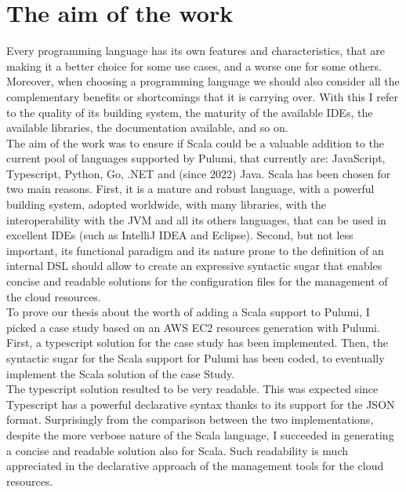\section{The aim of the work}
Every programming language has its own features and characteristics, that are making it a better choice for some use cases, and a worse one for some others.
Moreover, when choosing a programming language we should also consider all the complementary benefits or shortcomings that it is carrying over.
With this I refer to the quality of its building system, the maturity of the available IDEs, the available libraries, the documentation available, and so on.\\
The aim of the work was to ensure if Scala could be a valuable addition to the current pool of languages supported by Pulumi, that currently are: JavaScript, Typescript, Python, Go, .NET and  (since 2022) Java.
Scala has been chosen for two main reasons.
First, it is a mature and robust language, with a powerful building system, adopted worldwide, with many libraries, with the interoperability with the JVM and all its others languages, that can be used in excellent IDEs (such as IntelliJ IDEA and Eclipse).
Second, but not less important, its functional paradigm and its nature prone to the definition of an \gls{internal DSL} should allow to create an expressive syntactic sugar that enables concise and readable solutions for the configuration files for the management of the cloud resources.\\
To prove our thesis about the worth of adding a Scala support to Pulumi, I picked a case study based on an AWS EC2 resources generation with Pulumi.
First, a typescript solution for the case study has been implemented.
Then, the syntactic sugar for the Scala support for Pulumi has been coded, to eventually implement the Scala solution of the case Study.\\
The typescript solution resulted to be very readable. This was expected since Typescript has a powerful declarative syntax thanks to its support for the JSON format.
Surprisingly from the comparison between the two implementations, despite the more verbose nature of the Scala language, I succeeded in generating a concise and readable solution also for Scala.
Such readability is much appreciated in the declarative approach of the management tools for the cloud resources.
